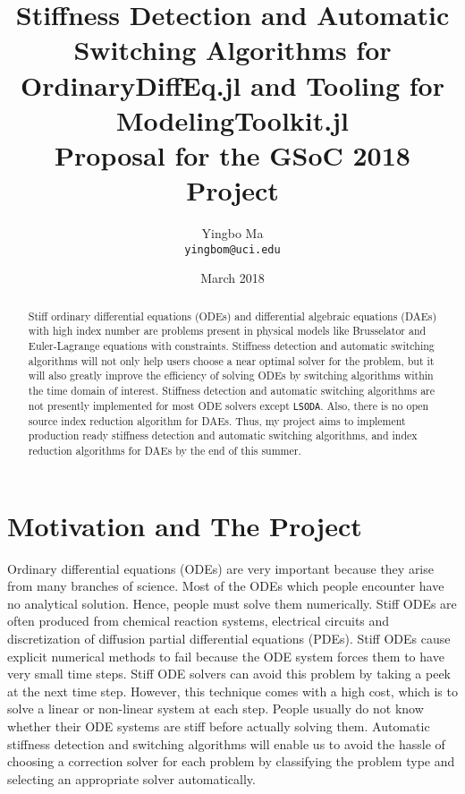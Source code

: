 \documentclass[12pt,a4paper]{article}
\author{Yingbo Ma \\ \tt{yingbom@uci.edu}}
\date{March 2018}
\title{Stiffness Detection and Automatic Switching Algorithms for
OrdinaryDiffEq.jl and Tooling for ModelingToolkit.jl \\
\large{Proposal for the GSoC 2018 Project}}
\begin{document}
\maketitle

\begin{abstract}
  Stiff ordinary differential equations (ODEs) and differential algebraic
  equations (DAEs) with high index number are problems present in physical
  models like Brusselator and Euler-Lagrange equations with constraints.
  Stiffness detection and automatic switching algorithms will not only help
  users choose a near optimal solver for the problem, but it will also greatly
  improve the efficiency of solving ODEs by switching algorithms within the
  time domain of interest. Stiffness detection and automatic switching
  algorithms are not presently implemented for most ODE solvers except
  \texttt{LSODA}. Also, there is no open source index reduction algorithm for
  DAEs. Thus, my project aims to implement production ready stiffness detection
  and automatic switching algorithms, and index reduction algorithms for DAEs
  by the end of this summer.
\end{abstract}

\section{Motivation and The Project}
Ordinary differential equations (ODEs) are very important because they arise
from many branches of science. Most of the ODEs which people encounter have no
analytical solution. Hence, people must solve them numerically. Stiff ODEs are
often produced from chemical reaction systems, electrical circuits and
discretization of diffusion partial differential equations (PDEs). Stiff ODEs
cause explicit numerical methods to fail because the ODE system forces them to
have very small time steps. Stiff ODE solvers can avoid this problem by taking
a peek at the next time step. However, this technique comes with a high cost,
which is to solve a linear or non-linear system at each step. People usually do
not know whether their ODE systems are stiff before actually solving them.
Automatic stiffness detection and switching algorithms will enable us to avoid
the hassle of choosing a correction solver for each problem by classifying the
problem type and selecting an appropriate solver automatically.
\end{document}
